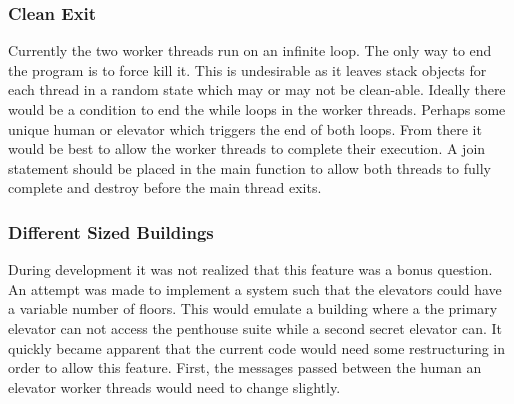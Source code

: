 \documentclass{article}
\begin{document}
\subsubsection{Clean Exit}
Currently the two worker threads run on an infinite loop.
The only way to end the program is to force kill it.
This is undesirable as it leaves stack objects for each thread in a random state which may or may not be clean-able.
Ideally there would be a condition to end the while loops in the worker threads.
Perhaps some unique human or elevator which triggers the end of both loops.
From there it would be best to allow the worker threads to complete their execution.
A join statement should be placed in the main function to allow both threads to fully complete and destroy before the main thread exits.
 
\subsubsection{Different Sized Buildings}
During development it was not realized that this feature was a bonus question. 
An attempt was made to implement a system such that the elevators could have a variable number of floors.
This would emulate a building where a the primary elevator can not access the penthouse suite while a second secret elevator can.
It quickly became apparent that the current code would need some restructuring in order to allow this feature.
First, the messages passed between the human an elevator worker threads would need to change slightly.
\end{document}
